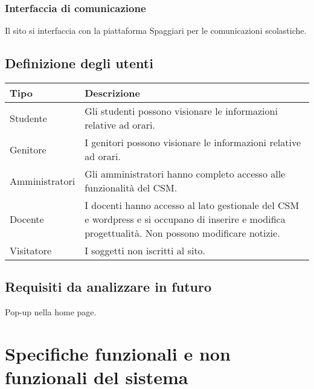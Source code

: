 \documentclass{article}
\begin{document}
	\subsubsection{\textbf{Interfaccia di comunicazione}}
	Il sito si interfaccia con la piattaforma Spaggiari per le comunicazioni scolastiche.	

	\subsection{\textbf{Definizione degli utenti}}
\begin{tabular}{ |p{3cm}|p{8cm}|  }
	\hline
	\textbf{Tipo}& \textbf{Descrizione}\\
	\hline
	Studente   & Gli studenti possono visionare le informazioni relative ad orari. \\
	\hline
	Genitore   & I genitori possono visionare le informazioni relative ad orari.
	\\
	\hline
	Amministratori  & Gli amministratori hanno completo accesso alle funzionalità del CSM.\\	
	\hline
	Docente & I docenti hanno accesso al lato gestionale del CSM e wordpress e si occupano di inserire e modifica progettualità. Non possono modificare notizie.\\
	\hline
	Visitatore & I soggetti non iscritti al sito.\\
\hline
\end{tabular}

	\subsection{\textbf{Requisiti da analizzare in futuro}}
	Pop-up nella home page.	
\clearpage
	\Large \section{\textbf{Specifiche funzionali e non funzionali del sistema}} 
\end{document}
